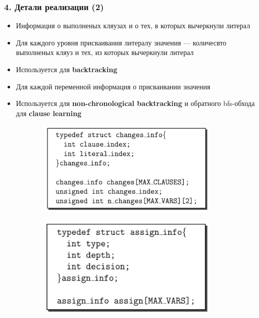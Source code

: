 \documentclass[aspectratio=169,xcolor=table,english]{beamer}
\begin{document}
\begin{frame}[fragile] \frametitle{4. Детали реализации (2)}
    \begin{minipage}[m]{0.5\linewidth}
        \begin{itemize}
            \item Информация о выполненых кляузах и о тех, в которых вычеркнули литерал
            \item Для каждого уровня присваивания литералу значения --- количесвто выполненых кляуз и тех, из которых вычеркнули литерал
            \item Используется для \textbf{backtracking}
            \item Для каждой переменной информация о присваивании значения
            \item Используется для \textbf{non-chronological backtracking} и обратного bfs-обхода для \textbf{clause learning}
        \end{itemize}
    \end{minipage}\hfill
    \begin{minipage}[m]{0.45\linewidth}
        \begin{figure}
            \centering
            \begin{subfigure}[b]{0.49\textwidth}
                \centering
                \includegraphics[width=0.95\textwidth]{figures/structure changes.png}
            \end{subfigure}
            \hfill
            \begin{subfigure}[b]{0.49\textwidth}
                \centering
                \includegraphics[width=0.95\textwidth]{figures/structure assign info.png}

\end{subfigure}
\end{figure}
\end{minipage}
\end{frame}
\end{document}
